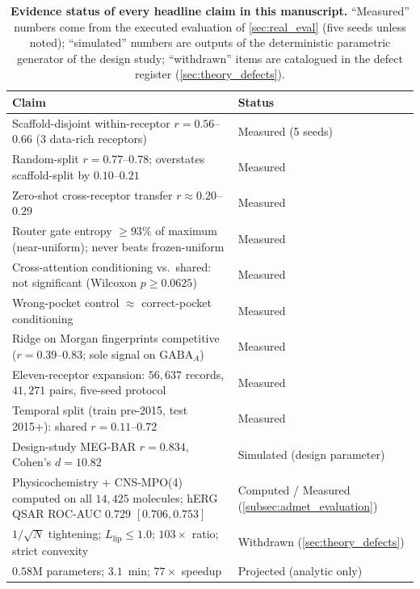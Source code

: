 \documentclass{article}
\theoremstyle{definition}
\begin{document}
\begin{table}[t]
\centering
\small
\caption{\textbf{Evidence status of every headline claim in this manuscript.} ``Measured'' numbers come from the executed evaluation of \cref{sec:real_eval} (five seeds unless noted); ``simulated'' numbers are outputs of the deterministic parametric generator of the design study; ``withdrawn'' items are catalogued in the defect register (\cref{sec:theory_defects}).}
\label{tab:evidence_status}
\begin{tabular}{p{8.6cm}l}
\toprule
Claim & Status \\
\midrule
Scaffold-disjoint within-receptor $r = 0.56$--$0.66$ (3 data-rich receptors) & Measured (5 seeds) \\
Random-split $r = 0.77$--$0.78$; overstates scaffold-split by $0.10$--$0.21$ & Measured \\
Zero-shot cross-receptor transfer $r \approx 0.20$--$0.29$ & Measured \\
Router gate entropy $\ge 93\%$ of maximum (near-uniform); never beats frozen-uniform & Measured \\
Cross-attention conditioning vs.\ shared: not significant (Wilcoxon $p \ge 0.0625$) & Measured \\
Wrong-pocket control $\approx$ correct-pocket conditioning & Measured \\
Ridge on Morgan fingerprints competitive ($r = 0.39$--$0.83$; sole signal on $\text{GABA}_A$) & Measured \\
Eleven-receptor expansion: $56{,}637$ records, $41{,}271$ pairs, five-seed protocol & Measured \\
Temporal split (train pre-2015, test 2015+): shared $r = 0.11$--$0.72$ & Measured \\
Design-study MEG-BAR $r = 0.834$, Cohen's $d = 10.82$ & Simulated (design parameter) \\
Physicochemistry + CNS-MPO(4) computed on all $14{,}425$ molecules; hERG QSAR ROC-AUC $0.729$ $[0.706, 0.753]$ & Computed / Measured (\cref{subsec:admet_evaluation}) \\
$1/\sqrt{N}$ tightening; $L_{\text{lip}} \le 1.0$; $103\times$ ratio; strict convexity & Withdrawn (\cref{sec:theory_defects}) \\
$0.58$M parameters; $3.1$~min; $77\times$ speedup & Projected (analytic only) \\
\bottomrule
\end{tabular}
\end{table}
\end{document}
